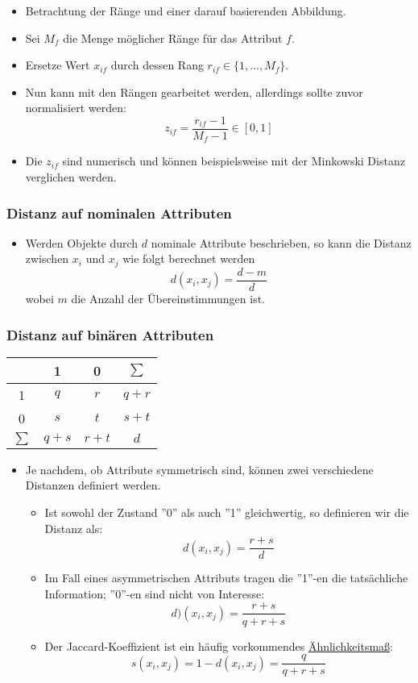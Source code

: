 \documentclass{scrartcl}
\begin{document}
\begin{itemize}
	\item Betrachtung der Ränge und einer darauf basierenden Abbildung.
	\item Sei $ M_f $ die Menge möglicher Ränge für das Attribut $ f $.
	\item Ersetze Wert $ x_{if} $ durch dessen Rang $ r_{if} \in \{ 
	1,\ldots,M_f \} $.
	\item Nun kann mit den Rängen gearbeitet werden, allerdings sollte zuvor 
	normalisiert werden:
	\[ z_{if} = \frac{r_{if} - 1}{M_f - 1} \in [0,1] \]
	\item Die $ z_{if} $ sind numerisch und können beispielsweise mit der 
	Minkowski Distanz verglichen werden.
\end{itemize}

\subsubsection{Distanz auf nominalen Attributen}

\begin{itemize}
	\item Werden Objekte durch $ d $ nominale Attribute beschrieben, so kann 
	die Distanz zwischen $ x_i $ und $ x_j $ wie folgt berechnet werden
	\[ d(x_i,x_j) = \frac{d-m}{d} \]
	wobei $ m $ die Anzahl der Übereinstimmungen ist.
\end{itemize}

\subsubsection{Distanz auf binären Attributen}

\begin{center}
	\begin{tabular}{|c|c|c|c|}
		\hline
		& 1 & 0 & $ \sum $ \\ 
		\hline
		1 & $ q $ & $ r $ & $ q+r $ \\ 
		\hline
		0 & $ s $ & $ t $ & $ s+t $ \\ 
		\hline
		$ \sum $ & $ q+s $ & $ r+t $ & $ d $ \\
		\hline
	\end{tabular} 
\end{center}

\begin{itemize}
	\item Je nachdem, ob Attribute symmetrisch sind, können zwei verschiedene 
	Distanzen definiert werden.
	\begin{itemize}
		\item Ist sowohl der Zustand ''0'' als auch ''1'' gleichwertig, so 
		definieren wir die Distanz als:
		\[ d(x_i,x_j) = \frac{r+s}{d} \]
		\item Im Fall eines asymmetrischen Attributs tragen die ''1''-en die 
		tatsächliche Information; ''0''-en sind nicht von Interesse:
		\[ d)(x_i,x_j) = \frac{r+s}{q+r+s} \]
		\item Der Jaccard-Koeffizient ist ein häufig vorkommendes 
		\underline{Ähnlichkeitsmaß}:
		\[ s(x_i,x_j) = 1 - d(x_i,x_j) = \frac{q}{q+r+s} \]
	\end{itemize}
\end{itemize}
\end{document}
